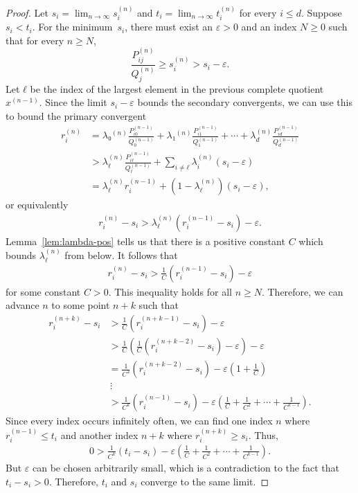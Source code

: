 \begin{proof}
  Let $s_i = \lim_{n → ∞} s_i^{(n)}$
  and $t_i = \lim_{n → ∞} t_i^{(n)}$ for every $i ≤ d$.
  Suppose $s_i < t_i$.
  For the minimum~$s_i$, there must exist an $ε > 0$ and an index $N ≥ 0$ such
  that for every $n ≥ N$,
  \[
    \frac{P_{ij}^{(n)}}{Q_j^{(n)}} ≥ s_i^{(n)} > s_i - ε.
  \]
  Let $ℓ$ be the index of the largest element in the previous complete quotient $x^{(n-1)}$.
  Since the limit $s_i - ε$ bounds the secondary convergents,
  we can use this to bound the primary convergent
  \begin{align*}
    r_i^{(n)}
    & = λ₀^{(n)} \frac{P_{i0}^{(n-1)}}{Q_0^{(n-1)}} + λ₁^{(n)} \frac{P_{i1}^{(n-1)}}{Q_1^{(n-1)}} + ⋯ + λ_d^{(n)} \frac{P_{id}^{(n-1)}}{Q_d^{(n-1)}} \\
    & > λ_ℓ^{(n)} \frac{P_{iℓ}^{(n-1)}}{Q_ℓ^{(n-1)}} + \sum_{i ≠ ℓ} λ_i^{(n)} (s_i - ε) \\
    & = λ_ℓ^{(n)} r_i^{(n-1)} + (1 - λ_ℓ^{(n)}) (s_i - ε),
  \end{align*}
  or equivalently
  \begin{align*}
    r_i^{(n)} - s_i > λ_ℓ^{(n)} \left( r_i^{(n-1)} - s_i \right) - ε.
  \end{align*}
  Lemma~\ref{lem:lambda-pos} tells us that there is a positive constant $C$
  which bounds $λ_ℓ^{(n)}$ from below.
  It follows that
  \begin{align*}
    r_i^{(n)} - s_i > \frac{1}{C} \left( r_i^{(n-1)} - s_i \right) - ε
  \end{align*}
  for some constant $C > 0$.
  This inequality holds for all $n ≥ N$.
  Therefore, we can advance $n$ to some point $n + k$
  such that
  \begin{align*}
    r_i^{(n+k)} - s_i
    & > \frac{1}{C} \left( r_i^{(n+k-1)} - s_i \right) - ε \\
    & > \frac{1}{C} \left(\frac{1}{C} \left( r_i^{(n+k-2)} - s_i \right) - ε\right) - ε \\
    & = \frac{1}{C^2} \left(r_i^{(n+k-2)} - s_i \right) - ε\left(1 + \frac{1}{C}\right) \\
    & \, ⋮ \\
    & > \frac{1}{C^k} \left( r_i^{(n-1)} - s_i \right) - ε\left( \frac{1}{C} + \frac{1}{C^2} + ⋯ + \frac{1}{C^{k-1}} \right).
  \end{align*}
  Since every index occurs infinitely often,
  we can find one index $n$ where $r_i^{(n-1)} ≤ t_i$
  and another index $n+k$ where $r_i^{(n+k)} ≥ s_i$.
  Thus,
  \begin{align*}
    0 > \frac{1}{C^k} \left( t_i - s_i \right) - ε\left( \frac{1}{C} + \frac{1}{C^2} + ⋯ + \frac{1}{C^{k-1}} \right).
  \end{align*}
  But $ε$ can be chosen arbitrarily small,
  which is a contradiction to the fact that $t_i - s_i > 0$.
  Therefore, $t_i$ and $s_i$ converge to the same limit.
\end{proof}

